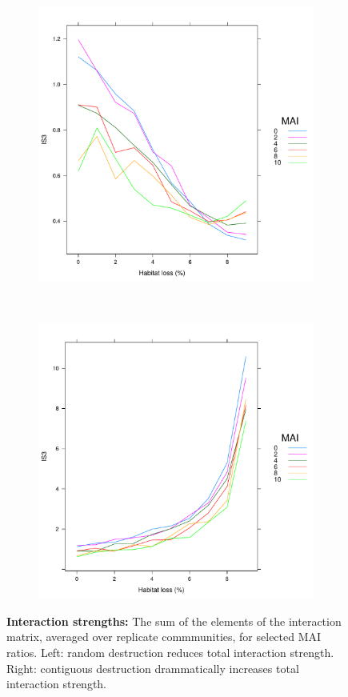 \begin{figure} 
		\centering      
        \begin{subfigure}[b]{0.5\textwidth}
                \includegraphics[width=\textwidth]{"random_plots/IS3"}
        \end{subfigure}%
        ~
        \begin{subfigure}[b]{0.5\textwidth}
                \includegraphics[width=\textwidth]{"contiguous_plots/IS3"}
        \end{subfigure}
        \caption{\textbf{Interaction strengths:} The sum of the elements of the interaction matrix, averaged over replicate commmunities, for selected MAI ratios. Left: random destruction reduces total interaction strength. Right: contiguous destruction drammatically increases total interaction strength.}\label{fig:IS3}
\end{figure}

